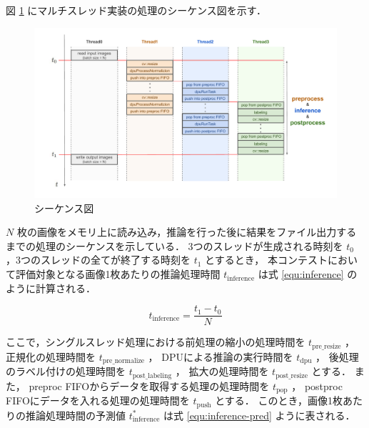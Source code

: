 図 \ref{fig:sequence} にマルチスレッド実装の処理のシーケンス図を示す．

\begin{figure}[h]
  \begin{center}
    \includegraphics[width=\linewidth]{figures/sw_opt_sequence.pdf}
    \caption{シーケンス図}
    \label{fig:sequence}
  \end{center}
\end{figure}

$N$ 枚の画像をメモリ上に読み込み，推論を行った後に結果をファイル出力するまでの処理のシーケンスを示している．
3つのスレッドが生成される時刻を $t_0$ ，3つのスレッドの全てが終了する時刻を $t_1$ とするとき，
本コンテストにおいて評価対象となる画像1枚あたりの推論処理時間 $t_{\mathrm{inference}}$ は式 \ref{equ:inference} のように計算される．

\begin{equation}
  \label{equ:inference}
  t_{\mathrm{inference}} = \frac{t_1 - t_0}{N}
\end{equation}

ここで，シングルスレッド処理における前処理の縮小の処理時間を $t_{\mathrm{pre\_resize}}$ ，
正規化の処理時間を $t_{\mathrm{pre\_normalize}}$ ，
DPUによる推論の実行時間を $t_{\mathrm{dpu}}$ ，
後処理のラベル付けの処理時間を $t_{\mathrm{post\_labeling}}$ ，
拡大の処理時間を $t_{\mathrm{post\_resize}}$ とする．
また，
preproc FIFOからデータを取得する処理の処理時間を $t_{\mathrm{pop}}$ ，
postproc FIFOにデータを入れる処理の処理時間を $t_{\mathrm{push}}$ とする．
このとき，画像1枚あたりの推論処理時間の予測値 $t_{\mathrm{inference}}^*$ は式 \ref{equ:inference-pred} ように表される．

